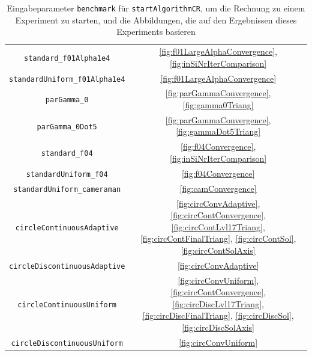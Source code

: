 \begin{table}[p]
\begin{tabular}{c|c}
    \texttt{standard\_f01Alpha1e4} &
    \ref{fig:f01LargeAlphaConvergence}, \ref{fig:inSiNrIterComparison}\\
    \texttt{standardUniform\_f01Alpha1e4} &
    \ref{fig:f01LargeAlphaConvergence}\\
    \texttt{parGamma\_0} &
    \ref{fig:parGammaConvergence}, \ref{fig:gamma0Triang}\\
    \texttt{parGamma\_0Dot5} &
    \ref{fig:parGammaConvergence}, \ref{fig:gammaDot5Triang}\\
    \texttt{standard\_f04} &
    \ref{fig:f04Convergence}, \ref{fig:inSiNrIterComparison}\\
    \texttt{standardUniform\_f04} &
    \ref{fig:f04Convergence}\\
    \texttt{standardUniform\_cameraman} &
    \ref{fig:camConvergence}\\
    \texttt{circleContinuousAdaptive} &
    \ref{fig:circConvAdaptive}, \ref{fig:circContConvergence},
    \ref{fig:circContLvl17Triang}, \ref{fig:circContFinalTriang},
    \ref{fig:circContSol}, \ref{fig:circContSolAxis}\\
    \texttt{circleDiscontinuousAdaptive} &
    \ref{fig:circConvAdaptive}\\
    \texttt{circleContinuousUniform} &
    \ref{fig:circConvUniform}, \ref{fig:circContConvergence},
    \ref{fig:circDiscLvl17Triang}, \ref{fig:circDiscFinalTriang},
    \ref{fig:circDiscSol}, \ref{fig:circDiscSolAxis}\\
    \texttt{circleDiscontinuousUniform} &
    \ref{fig:circConvUniform}\\
    \hline
  \end{tabular}
  \caption{Eingabeparameter \texttt{benchmark} für \texttt{startAlgorithmCR},
    um die Rechnung zu einem Experiment zu starten, und die Abbildungen, die
    auf den Ergebnissen dieses Experiments basieren} 
  \label{tab:usedBenchmarks}
\end{table} 

